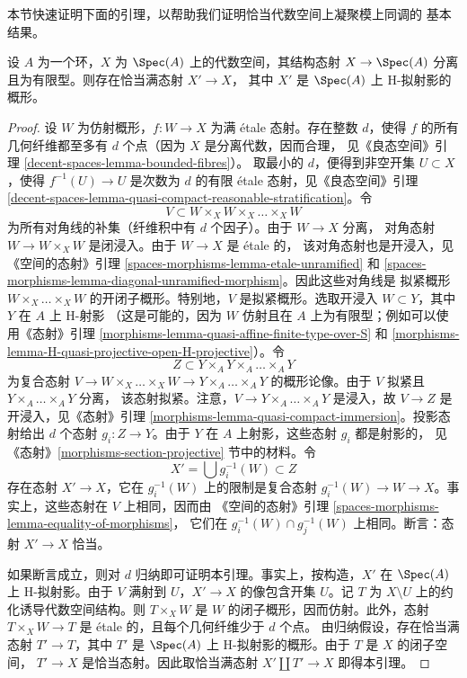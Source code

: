 \noindent
本节快速证明下面的引理，以帮助我们证明恰当代数空间上凝聚模上同调的
基本结果。

\begin{lemma}
\label{lemma-weak-chow}
设 $A$ 为一个环，$X$ 为 $\Spec(A)$ 上的代数空间，其结构态射
$X \to \Spec(A)$ 分离且为有限型。则存在恰当满态射 $X' \to X$，
其中 $X'$ 是 $\Spec(A)$ 上 H-拟射影的概形。
\end{lemma}

\begin{proof}
设 $W$ 为仿射概形，$f : W \to X$ 为满 \'etale 态射。存在整数 $d$，使得
$f$ 的所有几何纤维都至多有 $d$ 个点（因为 $X$ 是分离代数，因而合理，
见《良态空间》引理 \ref{decent-spaces-lemma-bounded-fibres}）。
取最小的 $d$，便得到非空开集 $U \subset X$，使得
$f^{-1}(U) \to U$ 是次数为 $d$ 的有限 \'etale 态射，见《良态空间》引理
\ref{decent-spaces-lemma-quasi-compact-reasonable-stratification}。令
$$
V \subset W \times_X W \times_X \ldots \times_X W
$$
为所有对角线的补集（纤维积中有 $d$ 个因子）。由于 $W \to X$ 分离，
对角态射 $W \to W \times_X W$ 是闭浸入。由于 $W \to X$ 是 \'etale 的，
该对角态射也是开浸入，见《空间的态射》引理
\ref{spaces-morphisms-lemma-etale-unramified} 和
\ref{spaces-morphisms-lemma-diagonal-unramified-morphism}。因此这些对角线是
拟紧概形 $W \times_X \ldots \times_X W$ 的开闭子概形。特别地，$V$
是拟紧概形。选取开浸入 $W \subset Y$，其中 $Y$ 在 $A$ 上 H-射影
（这是可能的，因为 $W$ 仿射且在 $A$ 上为有限型；例如可以使用《态射》引理
\ref{morphisms-lemma-quasi-affine-finite-type-over-S} 和
\ref{morphisms-lemma-H-quasi-projective-open-H-projective}）。令
$$
Z \subset Y \times_A Y \times_A \ldots \times_A Y
$$
为复合态射
$V \to W \times_X \ldots \times_X W \to Y \times_A \ldots \times_A Y$
的概形论像。由于 $V$ 拟紧且 $Y \times_A \ldots \times_A Y$ 分离，
该态射拟紧。注意，$V \to Y \times_A \ldots \times_A Y$ 是浸入，故
$V \to Z$ 是开浸入，见《态射》引理
\ref{morphisms-lemma-quasi-compact-immersion}。投影态射给出 $d$ 个态射
$g_i : Z \to Y$。由于 $Y$ 在 $A$ 上射影，这些态射 $g_i$ 都是射影的，
见《态射》\ref{morphisms-section-projective} 节中的材料。令
$$
X' = \bigcup g_i^{-1}(W) \subset Z
$$
存在态射 $X' \to X$，它在 $g_i^{-1}(W)$ 上的限制是复合态射
$g_i^{-1}(W) \to W \to X$。事实上，这些态射在 $V$ 上相同，因而由
《空间的态射》引理 \ref{spaces-morphisms-lemma-equality-of-morphisms}，
它们在 $g_i^{-1}(W) \cap g_j^{-1}(W)$ 上相同。断言：态射
$X' \to X$ 恰当。

\medskip\noindent
如果断言成立，则对 $d$ 归纳即可证明本引理。事实上，按构造，$X'$ 在
$\Spec(A)$ 上 H-拟射影。由于 $V$ 满射到 $U$，$X' \to X$ 的像包含开集
$U$。记 $T$ 为 $X \setminus U$ 上的约化诱导代数空间结构。则
$T \times_X W$ 是 $W$ 的闭子概形，因而仿射。此外，态射
$T \times_X W \to T$ 是 \'etale 的，且每个几何纤维少于 $d$ 个点。
由归纳假设，存在恰当满态射 $T' \to T$，其中 $T'$ 是
$\Spec(A)$ 上 H-拟射影的概形。由于 $T$ 是 $X$ 的闭子空间，
$T' \to X$ 是恰当态射。因此取恰当满态射
$X' \amalg T' \to X$ 即得本引理。


\end{proof}
